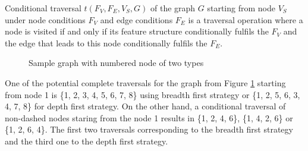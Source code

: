 
    \begin{definition}\label{def:conditional-traversal}
        Conditional traversal $t(F_V,F_E,V_S,G)$ of the graph $G$ starting from node $V_S$ under node conditions $F_V$ and edge conditions $F_E$ is a traversal operation where a node is visited if and only if its feature structure conditionally fulfils the $F_V$ and the edge that leads to this node conditionally fulfils the $F_E$.
    \end{definition}


    \begin{figure}[!ht]
        \centering
        \caption{Sample graph with numbered node of two types}
        \label{fig:example-traversal1}
    \end{figure}

    One of the potential complete traversals for the graph from Figure \ref{fig:example-traversal1} starting from node 1 is \{1, 2, 3, 4, 5, 6, 7, 8\} using breadth first strategy or \{1, 2, 5, 6, 3, 4, 7, 8\} for depth first strategy. On the other hand, a conditional traversal of non-dashed nodes staring from the node 1 results in \{1, 2, 4, 6\}, \{1, 4, 2, 6\} or \{1, 2, 6, 4\}. The first two traversals corresponding to the breadth first strategy and the third one to the depth first strategy. 

